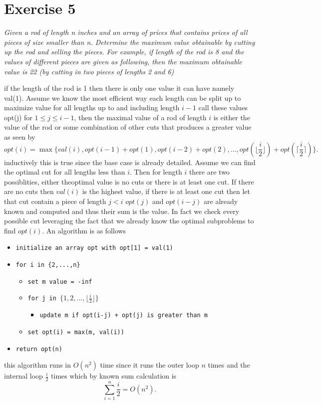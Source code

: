 \documentclass{amsart}
\begin{document}
\section{Exercise 5}
\emph{Given a rod of length n inches and an array of prices that contains prices of all pieces of size smaller than n. Determine the maximum value
obtainable by cutting up the rod and selling the pieces. For example, if length of the rod is 8 and the values of different pieces are given as following, 
then the maximum obtainable value is 22 (by cutting in two pieces of lengths 2 and 6)}

if the length of the rod is 1 then there is only one value it can have namely val(1).
Assume we know the most efficient way each length can be split up to maximize value for all lengths up to and including length $i-1$ call these values
opt(j) for $1 \le j \le i-1$, then
the maximal value of a rod of length $i$ is either the value of the rod or some combination of other cuts that produces a greater value as seen by
\[
    opt(i) = \max\{val(i), opt(i-1) + opt(1), opt(i-2) + opt(2), ..., opt(\lfloor \frac{i}{2} \rfloor) + opt(\lceil \frac{i}{2} \rceil)\}
.\] 
inductively this is true since the base case is already detailed. Assume we can find the optimal cut for all lengths less than $i$. Then for length $i$ there
are two possiblities, either theoptimal value is no cuts or there is at least one cut. If there are no cuts then $val(i)$ is the highest value, if there is at least one cut
then let that cut contain a piece of length $j < i$ $opt(j)$ and $opt(i-j)$ are already known and computed and thus their sum is the value. In fact we check every possible cut leveraging
the fact that we already know the optimal subproblems to find $opt(i)$.
An algorithm is as follows
{\small
    \begin{itemize}
        \item \texttt{initialize an array opt with opt[1] = val(1)}
        \item \texttt{for i in \{2,...,n\}}
            \begin{itemize}
                \item \texttt{set m value = -inf}
                \item \texttt{for j in $\{1,2,...,\lfloor \frac{i}{2} \rfloor\}$}
                    \begin{itemize}
                        \item \texttt{update m if opt(i-j) + opt(j) is greater than m}
                    \end{itemize}
                \item \texttt{set opt(i) = max(m, val(i))}
            \end{itemize}
        \item \texttt{return opt(n)}
    \end{itemize}
}
this algorithm runs in $O(n^2)$ time since it runs the outer loop $n$ times and the internal loop $\frac{i}{2}$ times which by known sum calculation
is
\[
\sum_{i=1}^{n}\frac{i}{2} = O(n^2)
.\] 
\end{document}
